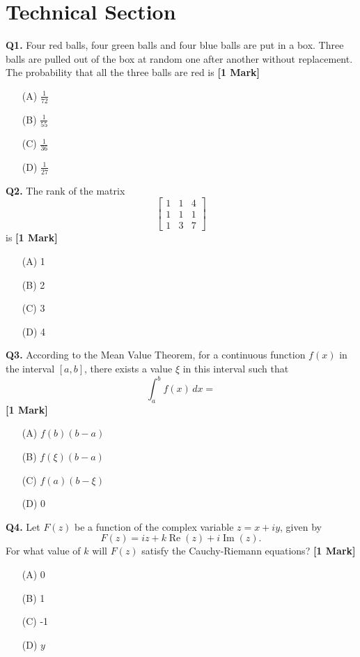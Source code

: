\documentclass[11pt]{article}
\newcommand{\questiona}[2]{
    \noindent\textbf{Q#2.} #1 \hfill \textbf{[1 Mark]}
}
\begin{document}
\section*{Technical Section}

\questiona{Four red balls, four green balls and four blue balls are put in a box. Three balls are pulled out of the box at random one after another without replacement. The probability that all the three balls are red is}{1}
\begin{enumerate}
    \item[(A)] \( \frac{1}{72} \)
    \item[(B)] \( \frac{1}{55} \)
    \item[(C)] \( \frac{1}{36} \)
    \item[(D)] \( \frac{1}{27} \)
\end{enumerate}
\vspace{0.5cm}

\questiona{The rank of the matrix 
\[
\begin{bmatrix}
1 & 1 & 4 \\
1 & 1 & 1 \\
1 & 3 & 7
\end{bmatrix}
\]
is}{2}
\begin{enumerate}
    \item[(A)] 1
    \item[(B)] 2
    \item[(C)] 3
    \item[(D)] 4
\end{enumerate}
\vspace{0.5cm}

\questiona{According to the Mean Value Theorem, for a continuous function \( f(x) \) in the interval \([a,b]\), there exists a value \( \xi \) in this interval such that
\[
\int_a^b f(x) \, dx =
\]}{3}
\begin{enumerate}
    \item[(A)] \( f(b)(b - a) \)
    \item[(B)] \( f(\xi)(b - a) \)
    \item[(C)] \( f(a)(b - \xi) \)
    \item[(D)] 0
\end{enumerate}
\vspace{0.5cm}

\questiona{Let \( F(z) \) be a function of the complex variable \( z = x + iy \), given by
\[
F(z) = i z + k \operatorname{Re}(z) + i \operatorname{Im}(z).
\]
For what value of \( k \) will \( F(z) \) satisfy the Cauchy-Riemann equations?}{4}
\begin{enumerate}
    \item[(A)] 0
    \item[(B)] 1
    \item[(C)] -1
    \item[(D)] \( y \)
\end{enumerate}
\vspace{0.5cm}
\end{document}
